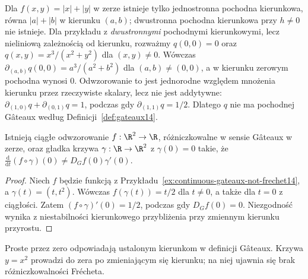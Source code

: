 \begin{przyklad}
\label{ex:nonlinear-directional14}
Dla $f(x,y)=|x|+|y|$ w zerze istnieje tylko jednostronna pochodna kierunkowa, równa $|a|+|b|$ w kierunku $(a,b)$; dwustronna pochodna kierunkowa przy $h\ne0$ nie istnieje. Dla przykładu z \emph{dwustronnymi} pochodnymi kierunkowymi, lecz nieliniową zależnością od kierunku, rozważmy $q(0,0)=0$ oraz $q(x,y)=x^3/(x^2+y^2)$ dla $(x,y)\ne0$. Wówczas $\partial_{(a,b)}q(0,0)=a^3/(a^2+b^2)$ dla $(a,b)\ne(0,0)$, a w kierunku zerowym pochodna wynosi $0$. Odwzorowanie to jest jednorodne względem mnożenia kierunku przez rzeczywiste skalary, lecz nie jest addytywne: $\partial_{(1,0)}q+\partial_{(0,1)}q=1$, podczas gdy $\partial_{(1,1)}q=1/2$. Dlatego $q$ nie ma pochodnej Gâteaux według Definicji~\ref{def:gateaux14}.
\end{przyklad}

\begin{stwierdzenie}
\label{prop:chain-fails14}
Istnieją ciągłe odwzorowanie $f:\R^2\to\R$, różniczkowalne w sensie Gâteaux w zerze, oraz gładka krzywa $\gamma:\R\to\R^2$ z $\gamma(0)=0$ takie, że $\frac{\mathrm d}{\mathrm dt}(f\circ\gamma)(0)\ne D_Gf(0)\gamma'(0)$.
\end{stwierdzenie}
\begin{proof}
Niech $f$ będzie funkcją z Przykładu~\ref{ex:continuous-gateaux-not-frechet14}, a $\gamma(t)=(t,t^2)$. Wówczas $f(\gamma(t))=t/2$ dla $t\ne0$, a także dla $t=0$ z ciągłości. Zatem $(f\circ\gamma)'(0)=1/2$, podczas gdy $D_Gf(0)=0$. Niezgodność wynika z niestabilności kierunkowego przybliżenia przy zmiennym kierunku przyrostu.
\end{proof}

\begin{center}

{\small Proste przez zero odpowiadają ustalonym kierunkom w definicji
Gâteaux. Krzywa $y=x^2$ prowadzi do zera po zmieniającym się
kierunku; na niej ujawnia się brak różniczkowalności Frécheta.}
\end{center}

